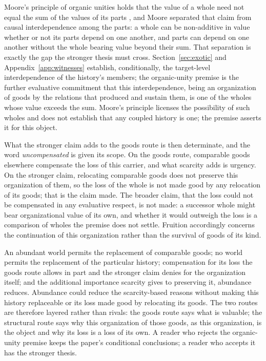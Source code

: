 Moore's principle of organic unities holds that the value of a whole need not equal
the sum of the values of its parts \cite{Moore1903}, and Moore separated
that claim from causal interdependence among the parts: a whole can be
non-additive in value whether or not its parts depend on one another, and
parts can depend on one another without the whole bearing value beyond
their sum. That separation is exactly the gap the stronger thesis must
cross. Section~\ref{sec:exotic} and Appendix~\ref{app:witnesses} establish,
conditionally, the target-level interdependence of the history's members;
the organic-unity premise is the further evaluative commitment that this
interdependence, being an organization of goods by the relations that
produced and sustain them, is one of the wholes whose value exceeds the sum.
Moore's principle licenses the possibility of such wholes and does not
establish that any coupled history is one; the premise asserts it for this
object.

What the stronger claim adds to the goods route is then determinate, and the
word \emph{uncompensated} is given its scope. On the goods route, comparable
goods elsewhere compensate the loss of this carrier, and what scarcity adds
is urgency. On the stronger claim, relocating comparable goods does not
preserve this organization of them, so the loss of the whole is not made
good by any relocation of its goods; that is the claim made. The broader
claim, that the loss could not be compensated in any evaluative respect, is
not made: a successor whole might bear organizational value of its own, and
whether it would outweigh the loss is a comparison of wholes the premise
does not settle. Fruition accordingly concerns the continuation of this
organization rather than the survival of goods of its kind.

An abundant world permits the replacement of comparable goods; no world
permits the replacement of the particular history; compensation for its
loss the goods route allows in part and the stronger claim denies for the
organization itself; and the additional importance scarcity gives to
preserving it, abundance reduces. Abundance could reduce the
scarcity-based reasons without making this history replaceable or its loss
made good by relocating its goods. The two routes are therefore layered rather than
rivals: the goods route says what is valuable; the structural route says why
this organization of those goods, as this organization, is the object and why
its loss is a loss of its own. A reader who rejects the organic-unity premise
keeps the paper's conditional conclusions; a reader who accepts it has the
stronger thesis.

